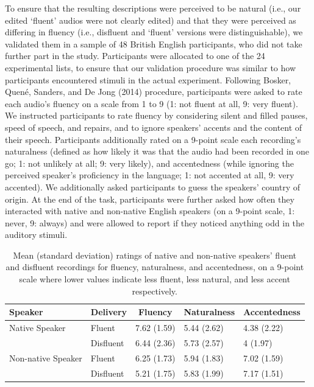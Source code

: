 \documentclass[
  man,floatsintext]{apa6}
\begin{document}
To ensure that the resulting descriptions were perceived to be natural (i.e., our edited `fluent' audios were not clearly edited) and that they were perceived as differing in fluency (i.e., disfluent and `fluent' versions were distinguishable), we validated them in a sample of 48 British English participants, who did not take further part in the study. Participants were allocated to one of the 24 experimental lists, to ensure that our validation procedure was similar to how participants encountered stimuli in the actual experiment. Following Bosker, Quené, Sanders, and De Jong (2014) procedure, participants were asked to rate each audio's fluency on a scale from 1 to 9 (1: not fluent at all, 9: very fluent). We instructed participants to rate fluency by considering silent and filled pauses, speed of speech, and repairs, and to ignore speakers' accents and the content of their speech. Participants additionally rated on a 9-point scale each recording's naturalness (defined as how likely it was that the audio had been recorded in one go; 1: not unlikely at all; 9: very likely), and accentedness (while ignoring the perceived speaker's proficiency in the language; 1: not accented at all, 9: very accented). We additionally asked participants to guess the speakers' country of origin. At the end of the task, participants were further asked how often they interacted with native and non-native English speakers (on a 9-point scale, 1: never, 9: always) and were allowed to report if they noticed anything odd in the auditory stimuli.

\begin{table}[tbp]

\begin{center}
\begin{threeparttable}

\caption{\label{tab:tab-results-validation}Mean (standard deviation) ratings of native and non-native speakers’ fluent and disfluent
recordings for fluency, naturalness, and accentedness, on a 9-point scale where lower values indicate
less fluent, less natural, and less accent respectively.}

\begin{tabular}{lllll}
\toprule
Speaker & \multicolumn{1}{c}{Delivery} & \multicolumn{1}{c}{Fluency} & \multicolumn{1}{c}{Naturalness} & \multicolumn{1}{c}{Accentedness}\\
\midrule
Native Speaker & Fluent & 7.62 (1.59) & 5.44 (2.62) & 4.38 (2.22)\\
 & Disfluent & 6.44 (2.36) & 5.73 (2.57) & 4 (1.97)\\
Non-native Speaker & Fluent & 6.25 (1.73) & 5.94 (1.83) & 7.02 (1.59)\\
 & Disfluent & 5.21 (1.75) & 5.83 (1.99) & 7.17 (1.51)\\
\bottomrule
\end{tabular}

\end{threeparttable}
\end{center}

\end{table}
\end{document}
